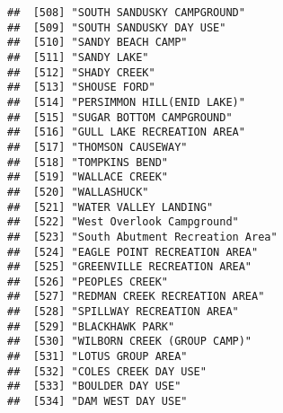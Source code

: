 \documentclass[
]{article}
\begin{document}
\begin{verbatim}
##  [508] "SOUTH SANDUSKY CAMPGROUND"                                                           
##  [509] "SOUTH SANDUSKY DAY USE"                                                              
##  [510] "SANDY BEACH CAMP"                                                                    
##  [511] "SANDY LAKE"                                                                          
##  [512] "SHADY CREEK"                                                                         
##  [513] "SHOUSE FORD"                                                                         
##  [514] "PERSIMMON HILL(ENID LAKE)"                                                           
##  [515] "SUGAR BOTTOM CAMPGROUND"                                                             
##  [516] "GULL LAKE RECREATION AREA"                                                           
##  [517] "THOMSON CAUSEWAY"                                                                    
##  [518] "TOMPKINS BEND"                                                                       
##  [519] "WALLACE CREEK"                                                                       
##  [520] "WALLASHUCK"                                                                          
##  [521] "WATER VALLEY LANDING"                                                                
##  [522] "West Overlook Campground"                                                            
##  [523] "South Abutment Recreation Area"                                                      
##  [524] "EAGLE POINT RECREATION AREA"                                                         
##  [525] "GREENVILLE RECREATION AREA"                                                          
##  [526] "PEOPLES CREEK"                                                                       
##  [527] "REDMAN CREEK RECREATION AREA"                                                        
##  [528] "SPILLWAY RECREATION AREA"                                                            
##  [529] "BLACKHAWK PARK"                                                                      
##  [530] "WILBORN CREEK (GROUP CAMP)"                                                          
##  [531] "LOTUS GROUP AREA"                                                                    
##  [532] "COLES CREEK DAY USE"                                                                 
##  [533] "BOULDER DAY USE"                                                                     
##  [534] "DAM WEST DAY USE"                                                                    

\end{verbatim}
\end{document}
